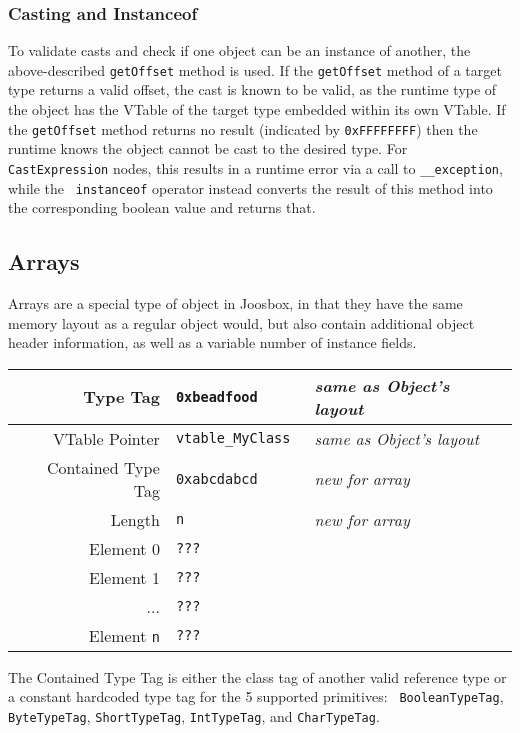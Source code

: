 \documentclass[letterpaper]{article}
\begin{document}
  \subsubsection{Casting and Instanceof}

  To validate casts and check if one object can be an instance of another, the
  above-described {\tt getOffset} method is used. If the {\tt getOffset}
  method of a target type returns a valid offset, the cast is known to be
  valid, as the runtime type of the object has the VTable of the target type
  embedded within its own VTable. If the {\tt getOffset} method returns no
  result (indicated by {\tt 0xFFFFFFFF}) then the runtime knows the object
  cannot be cast to the desired type. For {\tt CastExpression} nodes, this
  results in a runtime error via a call to {\tt \_\_exception}, while the {\tt
  instanceof} operator instead converts the result of this method into the
  corresponding boolean value and returns that.

  \subsection{Arrays}

  Arrays are a special type of object in Joosbox, in that they have the same
  memory layout as a regular object would, but also contain additional object
  header information, as well as a variable number of instance fields.

  \begin{center}
  \begin{tabular}{| r | l | l | }
    \hline
    Type Tag & {\tt 0xbeadfood } & {\em same as Object's layout} \\ \hline
    VTable Pointer & {\tt vtable\_MyClass } & {\em same as Object's layout} \\ \hline
    Contained Type Tag & {\tt 0xabcdabcd } & {\em new for array} \\ \hline
    Length & {\tt n } & {\em new for array} \\ \hline
    Element 0 & {\tt ??? } & \\ 
    Element 1 & {\tt ??? } & \\ 
    ... & {\tt ??? } & \\ 
    Element {\tt n} & {\tt ??? } & \\ \hline
  \end{tabular}
\end{center}

  The Contained Type Tag is either the class tag of another valid reference type
  or a constant hardcoded type tag for the 5 supported primitives: {\tt
  BooleanTypeTag}, {\tt ByteTypeTag}, {\tt ShortTypeTag}, {\tt IntTypeTag}, and
  {\tt CharTypeTag}.
\end{document}
